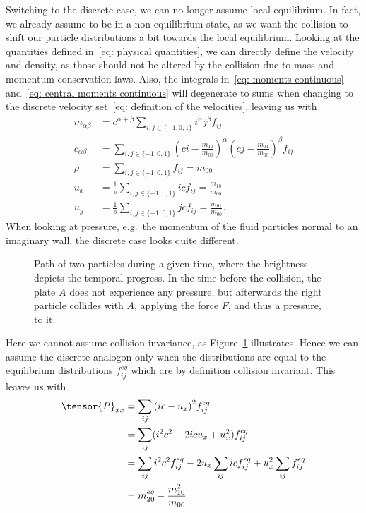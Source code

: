 Switching to the discrete case, we can no longer assume local equilibrium.
In fact, we already assume to be in a non equilibrium state, as we want the collision to shift our particle distributions a bit towards the local equilibrium.
Looking at the quantities defined in~\eqref{eq: physical quantities}, we can directly define the velocity and density, as those should not be altered by the collision due to mass and momentum conservation laws.
Also, the integrals in~\eqref{eq: moments continuous} and~\eqref{eq: central moments continuous} will degenerate to sums when changing to the discrete velocity set~\eqref{eq: definition of the velocities}, leaving us with
\begin{align}
  m_{\alpha\beta} &= c^{\alpha + \beta}\sum_{i,j \in \{-1,0,1\}} i^\alpha j^\beta f_{ij}
  \label{eq: moment definition}\\
  c_{\alpha\beta} &= \sum_{i,j \in \{-1,0,1\}}
  {\left(ci - \frac{m_{10}}{m_{00}}\right)}^\alpha
  {\left(cj - \frac{m_{01}}{m_{00}}\right)}^\beta f_{ij}
  \label{eq: central moment definition}\\
  \rho & = \sum_{i,j \in \{-1,0,1\}} f_{ij} = m_{00}
  \label{eq: density definition}\\
  u_x  & = \frac{1}{\rho} \sum_{i,j \in \{-1,0,1\}} ic f_{ij} = \frac{m_{10}}{m_{00}}
  \label{eq: x velocity definition}\\
  u_y  & = \frac{1}{\rho} \sum_{i,j \in \{-1,0,1\}} jc f_{ij} = \frac{m_{01}}{m_{00}}.
  \label{eq: y velocity definition}
\end{align}
When looking at pressure, e.g.\ the momentum of the fluid particles normal to an imaginary wall, the discrete case looks quite different.
\begin{figure}
\centering

\caption{Path of two particles during a given time, where the brightness depicts the temporal progress. In the time before the collision, the plate $A$ does not experience any pressure, but afterwards the right particle collides with $A$, applying the force $F$, and thus a pressure, to it.}
\label{fig: billard table}
\end{figure}
Here we cannot assume collision invariance, as Figure~\ref{fig: billard table} illustrates.
Hence we can assume the discrete analogon only when the distributions are equal to the equilibrium distributions $f_{ij}^{eq}$ which are by definition collision invariant.
This leaves us with
\begin{equation}
  \begin{aligned}
    \tensor{P}_{xx}
    & = \sum_{ij} {(ic - u_x)}^2 f_{ij}^{eq}
    \\ & =
    \sum_{ij} (i^2c^2 - 2 ic u_x + u_x^2) f_{ij}^{eq}
    \\ & =
    \sum_{ij} i^2 c^2 f_{ij}^{eq} - 2 u_x \sum_{ij} ic f_{ij}^{eq} + u_x^2 \sum_{ij}f_{ij}^{eq}
    \\ & = m_{20}^{eq} - \frac{m_{10}^2}{m_{00}}
  \end{aligned}
\end{equation}
